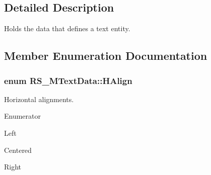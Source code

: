 \subsection{Detailed Description}
Holds the data that defines a text entity. 

\subsection{Member Enumeration Documentation}
\hypertarget{classRS__MTextData_ad819fe18c56a345fcfb205705c0445cc}{
\subsubsection[{H\-Align}]{\setlength{\rightskip}{0pt plus 5cm}enum {\bf R\-S\-\_\-\-M\-Text\-Data\-::\-H\-Align}}}\label{classRS__MTextData_ad819fe18c56a345fcfb205705c0445cc}
Horizontal alignments. \begin{Desc}
\item[Enumerator]\par
\begin{description}
\item[{\em 
\hypertarget{classRS__MTextData_ad819fe18c56a345fcfb205705c0445cca11ed5507f0197ab3a9590ca4365b065f}{H\-A\-Left}\label{classRS__MTextData_ad819fe18c56a345fcfb205705c0445cca11ed5507f0197ab3a9590ca4365b065f}
}]Left \item[{\em 
\hypertarget{classRS__MTextData_ad819fe18c56a345fcfb205705c0445cca79103da08b385441c59678334d35cba9}{H\-A\-Center}\label{classRS__MTextData_ad819fe18c56a345fcfb205705c0445cca79103da08b385441c59678334d35cba9}
}]Centered \item[{\em 
\hypertarget{classRS__MTextData_ad819fe18c56a345fcfb205705c0445ccaa47c1e71a2d76474a482c58df0e007ee}{H\-A\-Right}\label{classRS__MTextData_ad819fe18c56a345fcfb205705c0445ccaa47c1e71a2d76474a482c58df0e007ee}
}]Right \end{description}
\end{Desc}
